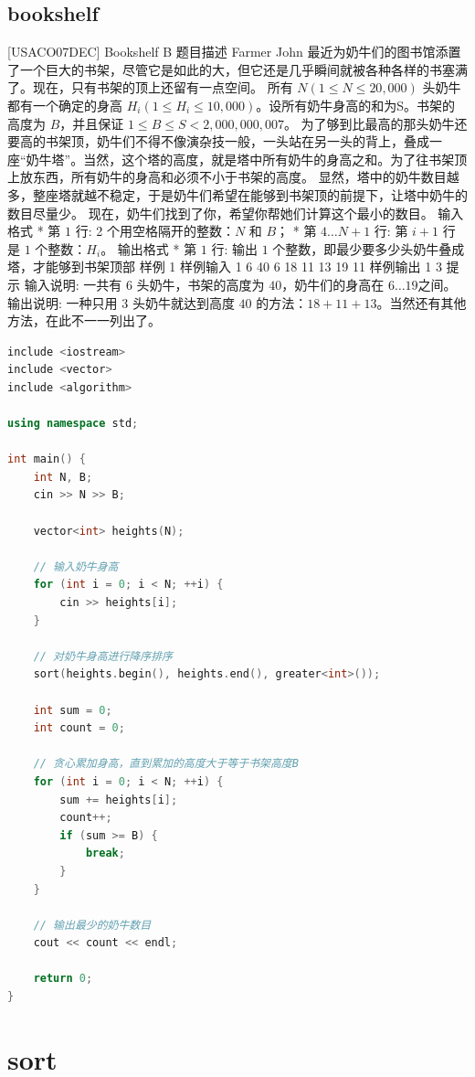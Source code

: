 \documentclass[12pt,twiside,a4paper]{ctexbook}
\numberwithin{chapter}{part}
\begin{document}
\section{bookshelf}
 [USACO07DEC] Bookshelf B
 题目描述
Farmer John 最近为奶牛们的图书馆添置了一个巨大的书架，尽管它是如此的大，但它还是几乎瞬间就被各种各样的书塞满了。现在，只有书架的顶上还留有一点空间。 
所有 $N(1 \le N \le 20,000)$ 头奶牛都有一个确定的身高 $H_i(1 \le H_i \le 10,000)$。设所有奶牛身高的和为S。书架的高度为 $B$，并且保证 $1 \le B \le S < 2,000,000,007$。 
为了够到比最高的那头奶牛还要高的书架顶，奶牛们不得不像演杂技一般，一头站在另一头的背上，叠成一座“奶牛塔”。当然，这个塔的高度，就是塔中所有奶牛的身高之和。为了往书架顶上放东西，所有奶牛的身高和必须不小于书架的高度。
显然，塔中的奶牛数目越多，整座塔就越不稳定，于是奶牛们希望在能够到书架顶的前提下，让塔中奶牛的数目尽量少。 现在，奶牛们找到了你，希望你帮她们计算这个最小的数目。
 输入格式
* 第 $1$ 行: 2 个用空格隔开的整数：$N$ 和 $B$；
* 第 $4\dots N+1$ 行: 第 $i+1$ 行是 $1$ 个整数：$H_i$。
 输出格式
* 第 $1$ 行: 输出 $1$ 个整数，即最少要多少头奶牛叠成塔，才能够到书架顶部
 样例 1
 样例输入 1
6 40
6
18
11
13
19
11
 样例输出 1
3
 提示
输入说明:
一共有 $6$ 头奶牛，书架的高度为 $40$，奶牛们的身高在 $6\dots19$之间。
输出说明:
一种只用 $3$ 头奶牛就达到高度 $40$ 的方法：$18+11+13$。当然还有其他方法，在此不一一列出了。
\begin{lstlisting}[language=c++,breaklines=true]
include <iostream>
include <vector>
include <algorithm>

using namespace std;

int main() {
    int N, B;
    cin >> N >> B;
    
    vector<int> heights(N);
    
    // 输入奶牛身高
    for (int i = 0; i < N; ++i) {
        cin >> heights[i];
    }
    
    // 对奶牛身高进行降序排序
    sort(heights.begin(), heights.end(), greater<int>());
    
    int sum = 0;
    int count = 0;
    
    // 贪心累加身高，直到累加的高度大于等于书架高度B
    for (int i = 0; i < N; ++i) {
        sum += heights[i];
        count++;
        if (sum >= B) {
            break;
        }
    }
    
    // 输出最少的奶牛数目
    cout << count << endl;
    
    return 0;
}
\end{lstlisting}

\chapter{sort}
\end{document}
